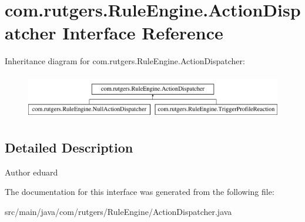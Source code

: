 \hypertarget{interfacecom_1_1rutgers_1_1RuleEngine_1_1ActionDispatcher}{}\section{com.\+rutgers.\+Rule\+Engine.\+Action\+Dispatcher Interface Reference}
\label{interfacecom_1_1rutgers_1_1RuleEngine_1_1ActionDispatcher}
Inheritance diagram for com.\+rutgers.\+Rule\+Engine.\+Action\+Dispatcher\+:\begin{figure}[H]
\begin{center}
\leavevmode
\includegraphics[height=1.958042cm]{interfacecom_1_1rutgers_1_1RuleEngine_1_1ActionDispatcher}
\end{center}
\end{figure}


\subsection{Detailed Description}
\begin{DoxyAuthor}{Author}
eduard 
\end{DoxyAuthor}


The documentation for this interface was generated from the following file\+:\begin{DoxyCompactItemize}
\item 
src/main/java/com/rutgers/\+Rule\+Engine/Action\+Dispatcher.\+java\end{DoxyCompactItemize}

